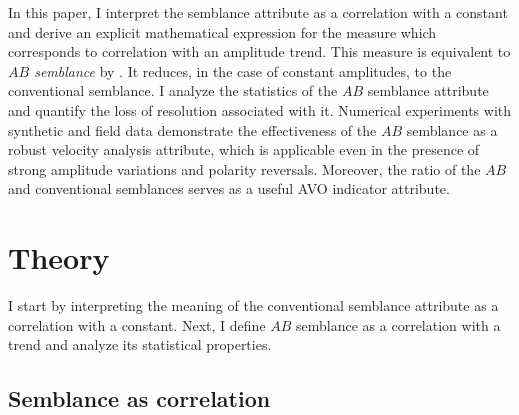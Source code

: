 In this paper, I interpret the semblance attribute as a correlation
with a constant and derive an explicit mathematical expression for the
measure which corresponds to correlation with an amplitude trend. This
measure is equivalent to \emph{$AB$ semblance} 
 by
\cite{GEO66-04-12841293,GEO67-05-16641672}. It reduces, in the case of
constant amplitudes, to the conventional semblance. I analyze the
statistics of the $AB$ semblance attribute and quantify the loss of
resolution associated with it. Numerical experiments with synthetic
and field data demonstrate the effectiveness of the $AB$ semblance as a
robust velocity analysis attribute, which is applicable even in the
presence of strong amplitude variations and polarity
reversals. Moreover, the ratio of the $AB$ and conventional semblances
serves as a useful AVO indicator attribute.

\section{Theory}

I start by interpreting the meaning of the conventional semblance
attribute as a correlation with a constant. Next, I define $AB$
semblance as a correlation with a trend and analyze its statistical
properties.

\subsection{Semblance as correlation}

